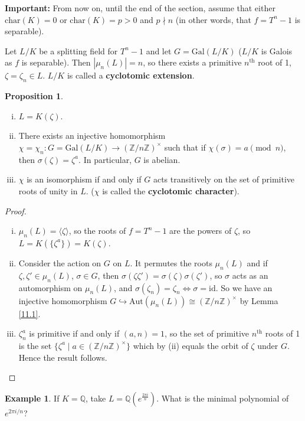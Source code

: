 \documentclass{article}
\theoremstyle{definition}
\newtheorem{prop}[theorem]{Proposition}
\newtheorem{example}{Example}[section]
\begin{document}
\textbf{Important:} From now on, until the end of the section, assume that either $\text{char}(K)=0$ or $\text{char}(K)=p>0$ and $p \nmid n$ (in other words, that $f=T^n-1$ is separable).
\vspace{1mm}

Let $L/K$ be a splitting field for $T^n-1$ and let $G=\text{Gal}(L/K)$ ($L/K$ is Galois as $f$ is separable). Then $|\mu_n(L)|=n$, so there exists a primitive $n^{\text{th}}$ root of 1, $\zeta=\zeta_n \in L$. $L/K$ is called a \textbf{cyclotomic extension}.

\begin{prop}\label{11.2}
    \begin{enumerate}[(i)]
        \item $L=K(\zeta)$.
        \item There exists an injective homomorphism $\chi = \chi_n : G = \text{Gal}(L/K) \to (\mathbb{Z}/n\mathbb{Z})^\times$ such that if $\chi(\sigma)=a \pmod{n}$, then $\sigma(\zeta)=\zeta^a$. In particular, $G$ is abelian.
        \item $\chi$ is an isomorphism if and only if $G$ acts transitively on the set of primitive roots of unity in $L$. ($\chi$ is called the \textbf{cyclotomic character}).
    \end{enumerate}
\end{prop}
\begin{proof}
    \begin{enumerate}[(i)]
        \item $\mu_n(L)=\langle\zeta \rangle$, so the roots of $f=T^n-1$ are the powers of $\zeta$, so $L=K(\{\zeta^a\})=K(\zeta)$.
        \item Consider the action on $G$ on $L$. It permutes the roots $\mu_n(L)$ and if $\zeta,\zeta' \in \mu_n(L)$, $\sigma \in G$, then $\sigma(\zeta \zeta') = \sigma(\zeta)\sigma(\zeta')$, so $\sigma$ acts as an automorphism on $\mu_n(L)$, and $\sigma(\zeta_n)=\zeta_n \iff \sigma=\text{id}$. So we have an injective homomorphism $G \hookrightarrow \text{Aut}(\mu_n(L)) \cong (\mathbb{Z}/n\mathbb{Z})^\times$ by Lemma \ref{11.1}.
        \item $\zeta_n^a$ is primitive if and only if $(a,n)=1$, so the set of primitive $n^{\text{th}}$ roots of 1 is the set $\{\zeta^a \mid a \in (\mathbb{Z}/n\mathbb{Z})^\times\}$ which by (ii) equals the orbit of $\zeta$ under $G$. Hence the result follows.
    \end{enumerate}
\end{proof}
\begin{example}
    If $K=\mathbb{Q}$, take $L=\mathbb{Q}(e^{\frac{2 \pi i}{n}})$. What is the minimal polynomial of $e^{2\pi i/n}$?
\end{example}
\end{document}
